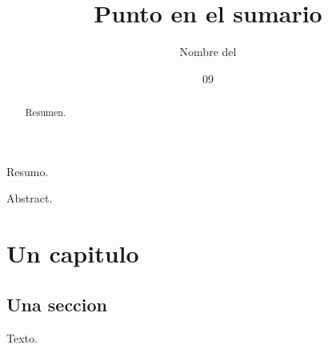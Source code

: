 \documentclass[dsc,spanish]{ufrj}
\title{Punto en el sumario}
\author{Nombre del}{Autor}
\date{09}{2026}
\begin{document}
  \maketitle
  \frontmatter
  \begin{brazilianabstract}Resumo.\end{brazilianabstract}
  \begin{foreignabstract}Abstract.\end{foreignabstract}
  \begin{abstract}Resumen.\end{abstract}
  \tableofcontents
  \mainmatter
  \chapter{Un capitulo}
  \section{Una seccion}
  Texto.
\end{document}
